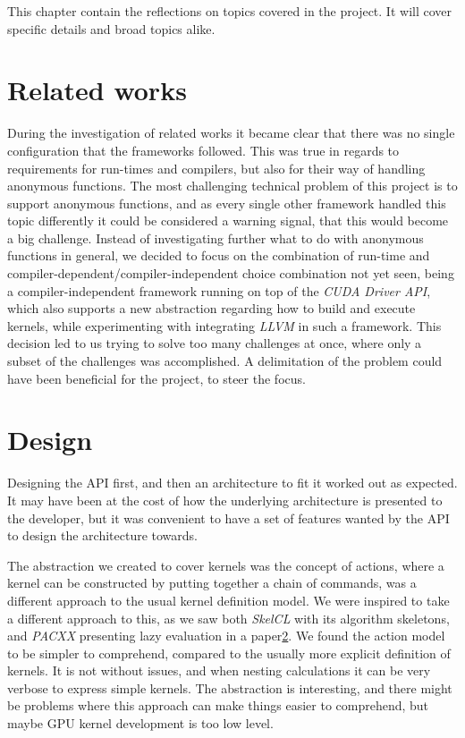 \label{cha:reflection}
This chapter contain the reflections on topics covered in the project. It will cover specific details and broad topics alike.

\section{Related works}
During the investigation of related works it became clear that there was no single configuration that the frameworks followed. This was true in regards to requirements for run-times and compilers, but also for their way of handling anonymous functions. The most challenging technical problem of this project is to support anonymous functions, and as every single other framework handled this topic differently it could be considered a warning signal, that this would become a big challenge. Instead of investigating further what to do with anonymous functions in general, we decided to focus on the combination of run-time and compiler-dependent/compiler-independent choice combination not yet seen, being a compiler-independent framework running on top of the \textit{CUDA Driver API}, which also supports a new abstraction regarding how to build and execute kernels, while experimenting with integrating \textit{LLVM} in such a framework. This decision led to us trying to solve too many challenges at once, where only a subset of the challenges was accomplished. A delimitation of the problem could have been beneficial for the project, to steer the focus.

\section{Design}
Designing the API first, and then an architecture to fit it worked out as expected. It may have been at the cost of how the underlying architecture is presented to the developer, but it was convenient to have a set of features wanted by the API to design the architecture towards.

The abstraction we created to cover kernels was the concept of actions, where a kernel can be constructed by putting together a chain of commands, was a different approach to the usual kernel definition model. We were inspired to take a different approach to this, as we saw both \textit{SkelCL} with its algorithm skeletons, and \textit{PACXX} presenting lazy evaluation in a paper\ref{}. We found the action model to be simpler to comprehend, compared to the usually more explicit definition of kernels. It is not without issues, and when nesting calculations it can be very verbose to express simple kernels. The abstraction is interesting, and there might be problems where this approach can make things easier to comprehend, but maybe GPU kernel development is too low level.

